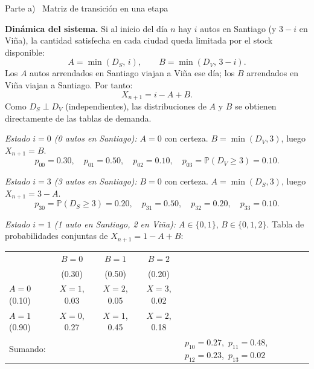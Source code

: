 \documentclass[10pt,a4paper]{article}
\newcommand{\Prob}[1]{\mathbb{P}\!\left(#1\right)}
\newcommand{\parteheader}[1]{%
  \vspace{8pt}\needspace{4cm}\noindent
  \begin{tcolorbox}[
    colback=subsecbg!18, colframe=subsecbg!55,
    sharp corners, boxrule=0.4pt,
    left=6pt, right=6pt, top=3pt, bottom=3pt,
    fontupper=\small\bfseries\sffamily,
  ]
  #1
  \end{tcolorbox}\vspace{2pt}%
}
\begin{document}
\vspace{6pt}

\parteheader{Parte a) \textperiodcentered\ Matriz de transici\'on en una etapa}

\textbf{Din\'amica del sistema.}\quad
Si al inicio del d\'ia $n$ hay $i$ autos en Santiago (y $3-i$ en Vi\~na), la cantidad
satisfecha en cada ciudad queda limitada por el stock disponible:
\[
  A = \min(D_S,\,i), \qquad B = \min(D_V,\,3-i).
\]
Los $A$ autos arrendados en Santiago viajan a Vi\~na ese d\'ia; los $B$ arrendados en
Vi\~na viajan a Santiago. Por tanto:
\[
  X_{n+1} = i - A + B.
\]
Como $D_S \perp D_V$ (independientes), las distribuciones de $A$ y $B$ se obtienen
directamente de las tablas de demanda.

\medskip
\noindent\textit{Estado $i=0$ (0 autos en Santiago):}\quad
$A=0$ con certeza. $B = \min(D_V,3)$, luego $X_{n+1}=B$.
\[
  p_{00}=0.30,\quad p_{01}=0.50,\quad p_{02}=0.10,\quad
  p_{03}=\Prob{D_V\ge 3}=0.10.
\]

\noindent\textit{Estado $i=3$ (3 autos en Santiago):}\quad
$B=0$ con certeza. $A=\min(D_S,3)$, luego $X_{n+1}=3-A$.
\[
  p_{30}=\Prob{D_S\ge 3}=0.20,\quad p_{31}=0.50,\quad p_{32}=0.20,\quad p_{33}=0.10.
\]

\noindent\textit{Estado $i=1$ (1 auto en Santiago, 2 en Vi\~na):}\quad
$A\in\{0,1\}$, $B\in\{0,1,2\}$. Tabla de probabilidades conjuntas de $X_{n+1}=1-A+B$:

\begin{center}
  \begin{tabular}{l|ccc|l}
    \toprule
                                 & $B=0$                                                         & $B=1$       & $B=2$       & \\
                                 & (0.30)                                                        & (0.50)      & (0.20)      & \\
    \midrule
    $A=0$ (0.10)                 & $X=1$, 0.03                                                   & $X=2$, 0.05 & $X=3$, 0.02 & \\
    $A=1$ (0.90)                 & $X=0$, 0.27                                                   & $X=1$, 0.45 & $X=2$, 0.18 & \\
    \midrule
    \multicolumn{4}{l}{Sumando:} & $p_{10}=0.27$,\ $p_{11}=0.48$,\ $p_{12}=0.23$,\ $p_{13}=0.02$                               \\
    \bottomrule
  \end{tabular}
\end{center}
\end{document}
